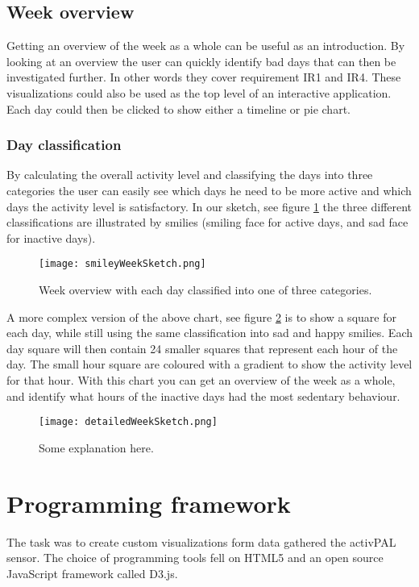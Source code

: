 \subsection{Week overview}
Getting an overview of the week as a whole can be useful as an introduction. By looking at an overview the user can quickly identify bad days that can then be investigated further. In other words they cover requirement IR1 and IR4. These visualizations could also be used as the top level of an interactive application. Each day could then be clicked to show either a timeline or pie chart.

\subsubsection{Day classification}
By calculating the overall activity level and classifying the days into three categories the user can easily see which days he need to be more active and which days the activity level is satisfactory. In our sketch, see figure \ref{fig:smileyWeek} the three different classifications are illustrated by smilies (smiling face for active days, and sad face for inactive days).

\begin{figure}[h!]
	\centering
		\texttt{[image: smileyWeekSketch.png]}
		\caption{\footnotesize Week overview with each day classified into one of three categories.}
		\label{fig:smileyWeek}
\end{figure}

A more complex version of the above chart, see figure \ref{fig:detailedWeek} is to show a square for each day, while still using the same classification into sad and happy smilies. Each day square will then contain 24 smaller squares that represent each hour of the day. The small hour square are coloured with a gradient to show the activity level for that hour. With this chart you can get an overview of the week as a whole, and identify what hours of the inactive days had the most sedentary behaviour. 

\begin{figure}[h!]
	\centering
		\texttt{[image: detailedWeekSketch.png]}
		\caption{\footnotesize Some explanation here.}
		\label{fig:detailedWeek}
\end{figure}

\section{Programming framework}
The task was to create custom visualizations form data gathered the activPAL sensor. The choice of programming tools fell on HTML5 and an open source JavaScript framework called D3.js.

